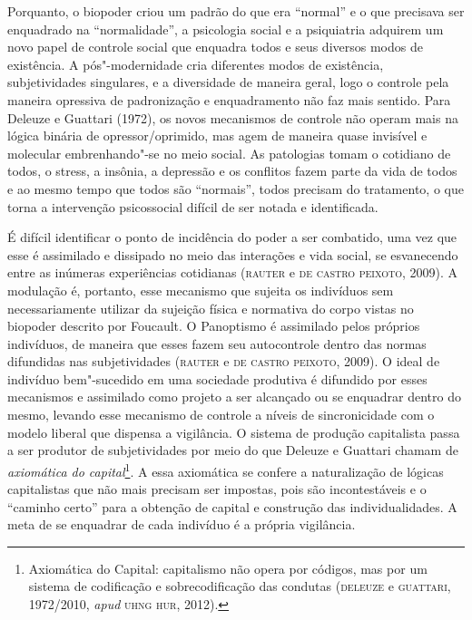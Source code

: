 Porquanto, o biopoder criou um padrão do que era ``normal'' e o que
precisava ser enquadrado na ``normalidade'', a psicologia social e a
psiquiatria adquirem um novo papel de controle social que enquadra todos
e seus diversos modos de existência. A pós"-modernidade cria diferentes
modos de existência, subjetividades singulares, e a diversidade de
maneira geral, logo o controle pela maneira opressiva de padronização e
enquadramento não faz mais sentido. Para Deleuze e Guattari (1972), os
novos mecanismos de controle não operam mais na lógica binária de
opressor/oprimido, mas agem de maneira quase invisível e molecular
embrenhando"-se no meio social. As patologias tomam o cotidiano de todos,
o stress, a insônia, a depressão e os conflitos fazem parte da vida de
todos e ao mesmo tempo que todos são ``normais'', todos precisam do
tratamento, o que torna a intervenção psicossocial difícil de ser notada
e identificada.

É difícil identificar o ponto de incidência do poder a ser combatido,
uma vez que esse é assimilado e dissipado no meio das interações e vida
social, se esvanecendo entre as inúmeras experiências cotidianas (\textsc{rauter} e \textsc{de castro peixoto}, 2009). A modulação é, portanto, esse mecanismo que
sujeita os indivíduos sem necessariamente utilizar da sujeição física e
normativa do corpo vistas no biopoder descrito por Foucault. O
Panoptismo é assimilado pelos próprios indivíduos, de maneira que esses
fazem seu autocontrole dentro das normas difundidas nas subjetividades
(\textsc{rauter} e \textsc{de castro peixoto}, 2009). O ideal de indivíduo bem"-sucedido em
uma sociedade produtiva é difundido por esses mecanismos e assimilado
como projeto a ser alcançado ou se enquadrar dentro do mesmo, levando
esse mecanismo de controle a níveis de sincronicidade com o modelo
liberal que dispensa a vigilância. O sistema de produção capitalista
passa a ser produtor de subjetividades por meio do que Deleuze e
Guattari chamam de \emph{axiomática do capital}\footnote{Axiomática do
  Capital: capitalismo não opera por códigos, mas por um sistema de
  codificação e sobrecodificação das condutas (\textsc{deleuze} e \textsc{guattari},
  1972/2010, \emph{apud} \textsc{uhng hur}, 2012).}. A essa axiomática se confere a
naturalização de lógicas capitalistas que não mais precisam ser
impostas, pois são incontestáveis e o ``caminho certo'' para a obtenção
de capital e construção das individualidades. A meta de se enquadrar de
cada indivíduo é a própria vigilância.

